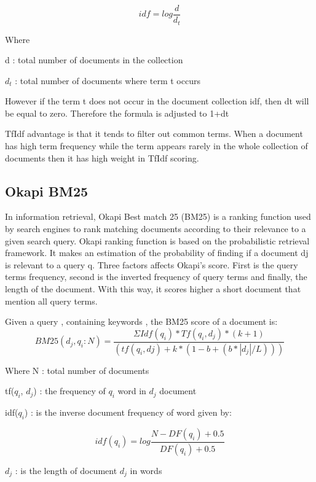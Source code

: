 \begin{equation}
	idf = log \frac{ d }{ d_t}
\end{equation}

Where

d : total number of documents in the collection

$d_t$ : total number of documents where term t occurs

However if the term t does not occur in the document collection idf, then dt will be equal to zero. Therefore the formula is adjusted to 1+dt

TfIdf advantage is that it tends to filter out common terms. When a document has high term frequency while the term appears rarely in the whole collection of documents then it has high weight in TfIdf scoring.


\subsection{Okapi BM25}

In information retrieval, Okapi Best match 25 (BM25)  is a ranking function used by search engines to rank matching documents according to their relevance to a given search query. Okapi ranking function is based on the probabilistic retrieval framework. It makes an estimation of the probability of finding if a document dj is relevant to a query q. Three factors affects Okapi's score. First is the query terms frequency, second is the inverted frequency of query terms and finally, the length of the document. With this way, it scores higher a short document that mention all query terms.

Given a query , containing keywords , the BM25 score of a document is:
\begin{equation}
BM25(d_j,q_i:N) = \frac{ ΣIdf(q_i)*Tf(q_i, d_j)*(k + 1) } { ( tf(q_i, dj)+k* (1-b+(b*|d_j|/L))) }
\end{equation}

Where
N : total number of documents

tf($q_i$, $d_j$) : the frequency of $q_i$ word in $d_j$ document

idf($q_i$) : is the inverse document frequency of word given by:

\begin{equation}
idf(q_i) = log \frac{ N-DF(q_i) + 0.5 } { DF(q_i) +0.5 }
\end{equation}

$d_j$ : is the length of document $d_j$ in words

